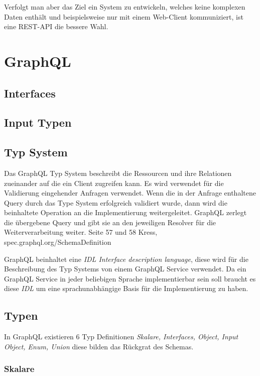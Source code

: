 \documentclass[bachelor, german ]{hgbthesis}
\begin{document}
Verfolgt man aber das Ziel ein System zu entwickeln, welches keine komplexen Daten enthält und beispielsweise nur mit einem Web-Client kommuniziert, ist eine REST-API die bessere Wahl.

\chapter{GraphQL}

\section{Interfaces}

\section{Input Typen}

\section{Typ System}

Das GraphQL Typ System beschreibt die Ressourcen und ihre Relationen zueinander auf die ein Client zugreifen kann. Es wird verwendet für die Validierung eingehender Anfragen verwendet.
Wenn die in der Anfrage enthaltene Query durch das Type System erfolgreich validiert wurde, dann wird die beinhaltete Operation an die Implementierung weitergeleitet.
GraphQL zerlegt die übergebene Query und gibt sie an den jeweiligen Resolver für die Weiterverarbeitung weiter. 
Seite 57 und 58 Kress, spec.graphql.org/SchemaDefinition

GraphQL beinhaltet eine \textit{IDL Interface description language}, diese wird für die Beschreibung des Typ Systems von einem GraphQL Service verwendet.
Da ein GraphQL Service in jeder beliebigen Sprache implementierbar sein soll braucht es diese \textit{IDL} um eine sprachunabhängige Basis für die Implementierung zu haben.

\section{Typen}
In GraphQL existieren 6 Typ Definitionen \textit{Skalare, Interfaces, Object, Input Object, Enum, Union} diese bilden das Rückgrat des Schemas.

\subsection{Skalare}
\end{document}
